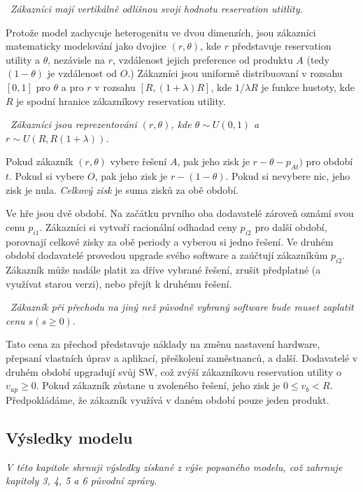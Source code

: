 \begin{multicols}{2}
	\vspace{10pt}
	~{\em Zákazníci mají vertikálně odlišnou svoji hodnotu reservation utitlity.}
	\vspace{10pt}

	Protože model zachycuje heterogenitu ve dvou dimenzích, jsou zákazníci matematicky modelování jako dvojice $(r,\theta)$, kde $r$ představuje reservation utility a $\theta$, nezávisle na $r$, vzdálenost jejich preference od produktu $A$ (tedy $(1-\theta)$ je vzdálenost od $O$.) Zákazníci jsou uniformě distribuovaní v rozsahu $[0,1]$ pro $\theta$ a pro $r$ v rozsahu $[R, (1+\lambda)R]$, kde $1/\lambda R$ je funkce hustoty, kde $R$ je spodní hranice zákazníkovy reservation utility.

		\vspace{10pt}
		~{\em Zákazníci jsou reprezentováni $(r,\theta)$, kde $\theta \sim U(0,1)$ a $r \sim U(R, R(1+\lambda))$.}
		\vspace{10pt}

	Pokud zákazník $(r,\theta)$ vybere řešení $A$, pak jeho zisk je $r-\theta - p_{At})$ pro období $t$. Pokud si vybere $O$, pak jeho zisk je $r-(1-\theta)$. Pokud si nevybere nic, jeho zisk je nula. {\em Celkový zisk} je suma zisků za obě období.

	Ve hře jsou dvě období. Na začátku prvního oba dodavatelé zároveň oznámí svou cenu $p_{i1}$. Zákazníci si vytvoří racionální odhadad ceny $p_{i2}$ pro další období, porovnají celkové zisky za obě periody a vyberou si jedno řešení. Ve druhém období dodavatelé provedou upgrade svého software a zaúčtují zákazníkům $p_{i2}$. Zákazník může nadále platit za dříve vybrané řešení, zrušit předplatné (a využívat starou verzi), nebo přejít k druhému řešení.

		\vspace{10pt}
		~{\em Zákazník při přechodu na jiný než původně vybraný software bude muset zaplatit cenu $s (s\geq0)$.}
		\vspace{10pt}

	Tato cena za přechod představuje náklady na změnu nastavení hardware, přepsaní vlastních úprav a aplikací, přeškolení zaměstnanců, a další. Dodavatelé v druhém období upgradují svůj SW, což zvýší zákazníkovu reservation utility o $v_{up}\geq0$. Pokud zákazník zůstane u zvoleného řešení, jeho zisk je $0\leq v_b < R$. Předpokládáme, že zákazník využívá v daném období pouze jeden produkt.

	\subsection*{Výsledky modelu}
	{\em V této kapitole shrnuji výsledky získané z výše popsaného modelu, což zahrnuje kapitoly 3, 4, 5 a 6 původní zprávy.}


\end{multicols}
